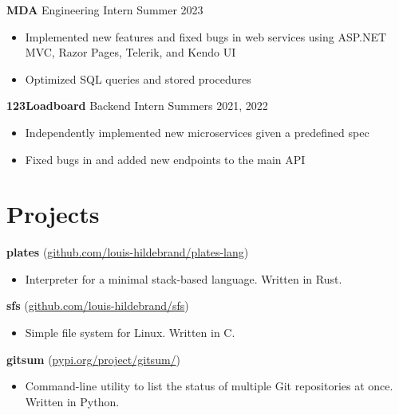\textbf{MDA} Engineering Intern
\hfill
Summer 2023
\begin{itemize}
	\item Implemented new features and fixed bugs in web services using ASP.NET MVC, Razor Pages, Telerik, and Kendo UI
	\item Optimized SQL queries and stored procedures
\end{itemize}

\textbf{123Loadboard} Backend Intern
\hfill
Summers 2021, 2022
\begin{itemize}
	\item Independently implemented new microservices given a predefined spec
	\item Fixed bugs in and added new endpoints to the main API
\end{itemize}

\section*{Projects}

\textbf{plates} (\href{https://github.com/louis-hildebrand/plates-lang}{github.com/louis-hildebrand/plates-lang})
\begin{itemize}
	\item Interpreter for a minimal stack-based language. Written in Rust.
\end{itemize}

\textbf{sfs} (\href{https://github.com/louis-hildebrand/sfs}{github.com/louis-hildebrand/sfs})
\begin{itemize}
	\item Simple file system for Linux. Written in C.
\end{itemize}

\textbf{gitsum} (\href{https://pypi.org/project/gitsum/}{pypi.org/project/gitsum/})
\begin{itemize}
	\item Command-line utility to list the status of multiple Git repositories at once. Written in Python.
\end{itemize}
